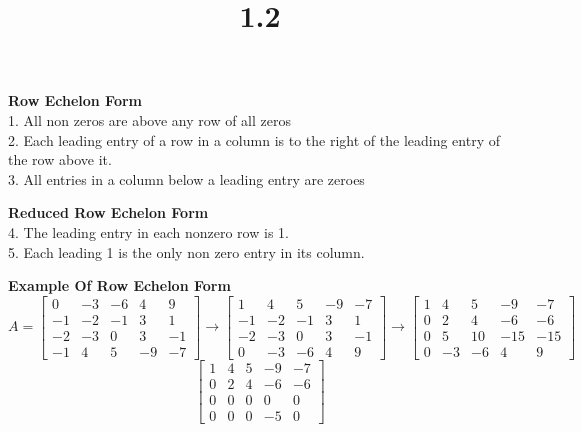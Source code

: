 \documentclass{article}
\title{1.2}
\begin{document}
  \maketitle
  \textbf{Row Echelon Form}\\
  1. All non zeros are above any row of all zeros\\
  2. Each leading entry of a row in a column is to the right of the leading entry of the row above it.\\
  3. All entries in a column below a leading entry are zeroes

  \textbf{Reduced Row Echelon Form}\\
  4. The leading entry in each nonzero row is 1.\\
  5. Each leading 1 is the only non zero entry in its column.

  \textbf{Example Of Row Echelon Form}
  \[
    A =
    \begin{bmatrix}
      0 & -3 & -6 & 4 & 9\\
      -1 & -2 & -1 &3 &1 \\
      -2 & -3 &0 &3 &-1\\
      -1 &4 &5 &-9 &-7
    \end{bmatrix} \to
    \begin{bmatrix}
      1 &4 & 5 & -9 &-7 \\
      -1 & -2 & -1 &3 &1 \\
      -2 & -3 &0 &3 &-1\\
      0 &-3 &-6 &4 &9
    \end{bmatrix} \to 
    \begin{bmatrix}
      1 &4 &5 &-9 &-7\\
      0 &2 &4 &-6 &-6\\
      0 &5 &10 &-15 &-15\\
      0 &-3 &-6 &4 &9
    \end{bmatrix}
  \]
  \[
    \begin{bmatrix}
      1 &4 &5 &-9 &-7\\
      0 &2 &4 &-6 &-6\\
      0 &0 &0 & 0 &0 \\
      0 &0 &0 &-5 &0
    \end{bmatrix}
  \]
  
\end{document}
